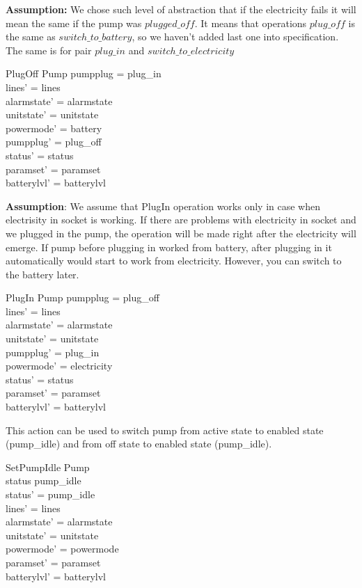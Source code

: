 \documentclass{article}
\begin{document}
	

\textbf{Assumption:} We chose such level of abstraction that if the electricity fails it will mean the same if the pump was $plugged\_off$. It means that operations $plug\_off$ is the same as $switch\_to\_battery$, so we haven't added last one into specification. The same is for pair $plug\_in$ and $switch\_to\_electricity$

		
	\begin{schema}{PlugOff}
		\Delta Pump		
	\where
		pumpplug = plug\_in \\		
		lines' = lines  \\
    	alarmstate' = alarmstate \\
    	unitstate' = unitstate \\
    	powermode' = battery \\
    	pumpplug' = plug\_off \\
    	status' = status \\		
		paramset' = paramset\\
		batterylvl' = batterylvl		
	\end{schema}
	
	 \textbf{Assumption}: We assume that PlugIn operation works only in case when electrisity in socket is working. If there are problems with electricity in socket and we plugged in the pump, the operation will be made right after the electricity will emerge. If pump before plugging in worked from battery, after plugging in it automatically would start to work from electricity. However, you can switch to the battery later. 
	
	\begin{schema}{PlugIn}
		\Delta Pump 
	\where
		pumpplug = plug\_off \\
		lines' = lines  \\
    	alarmstate' = alarmstate \\
    	unitstate' = unitstate \\
    	pumpplug' = plug\_in \\
    	powermode' = electricity \\
		status' = status \\
		paramset' = paramset\\
		batterylvl' = batterylvl	
	\end{schema}
   


	This action can be used to switch pump from active state to enabled state (pump\_idle) and from off state to enabled state (pump\_idle).
	\begin{schema}{SetPumpIdle}
		\Delta Pump \\
	\where 
		status \neq pump\_idle \\
		status' = pump\_idle \\
		lines' = lines \\
    	alarmstate' = alarmstate \\
    	unitstate' = unitstate \\
    	powermode' = powermode \\
		paramset' = paramset\\
		batterylvl' = batterylvl
	\end{schema}
	
\end{document}
